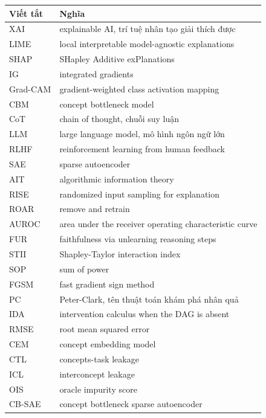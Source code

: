 \begin{tabular}{@{}lp{9cm}@{}}
\toprule
Viết tắt & Nghĩa \\
\midrule
XAI & explainable AI, trí tuệ nhân tạo giải thích được \\
LIME & local interpretable model-agnostic explanations \\
SHAP & SHapley Additive exPlanations \\
IG & integrated gradients \\
Grad-CAM & gradient-weighted class activation mapping \\
CBM & concept bottleneck model \\
CoT & chain of thought, chuỗi suy luận \\
LLM & large language model, mô hình ngôn ngữ lớn \\
RLHF & reinforcement learning from human feedback \\
SAE & sparse autoencoder \\
AIT & algorithmic information theory \\
RISE & randomized input sampling for explanation \\
ROAR & remove and retrain \\
AUROC & area under the receiver operating characteristic curve \\
FUR & faithfulness via unlearning reasoning steps \\
STII & Shapley-Taylor interaction index \\
SOP & sum of power \\
FGSM & fast gradient sign method \\
PC & Peter-Clark, tên thuật toán khám phá nhân quả \\
IDA & intervention calculus when the DAG is absent \\
RMSE & root mean squared error \\
CEM & concept embedding model \\
CTL & concepts-task leakage \\
ICL & interconcept leakage \\
OIS & oracle impurity score \\
CB-SAE & concept bottleneck sparse autoencoder \\
\bottomrule
\end{tabular}
